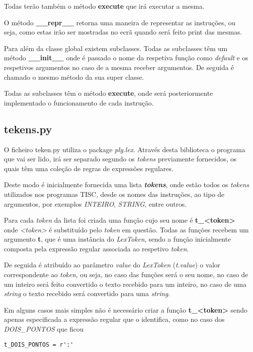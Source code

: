 \documentclass[titlepage,11pt,svgnames]{article}   %
\begin{document}
\begin{itemize}
Todas terão também o método \textbf{execute} que irá executar a mesma.

O método \textbf{\_\_repr\_\_} retorna uma maneira de representar as instruções, ou seja, como estas irão ser mostradas no ecrã quando será feito print das mesmas.

Para além da classe global existem subclasses. Todas as subclasses têm um método \textbf{\_\_init\_\_} onde é passado o nome da respetiva função como \textit{default} e os respetivos argumentos no caso de a mesma receber argumentos. De seguida é chamado o mesmo método da sua super classe.

Todas as subclasses têm o método \textbf{execute}, onde será posteriormente implementado o funcionamento de cada instrução.

\end{itemize}

\subsection{tekens.py}

O ficheiro teken.py utiliza o package \textit{ply.lex}. Através desta biblioteca o programa que vai ser lido, irá ser separado segundo os \textit{tokens} previamente fornecidos, os quais têm uma coleção de regras de expressões regulares.

Deste modo é inicialmente fornecida uma lista \textbf{\textit{tokens}}, onde estão todos os \textit{tokens} utilizados nos programas TISC, desde os nomes das instruções, ao tipo de argumentos, por exemplos \textit{INTEIRO}, \textit{STRING}, entre outros.

Para cada \textit{token} da lista foi criada uma função cujo seu nome é \textbf{t\_<token>} onde \textit{<token>} é substituído pelo \textit{token} em questão. Todas as funções recebem um argumento \textbf{t}, que é uma instância do \textit{LexToken}, sendo a função inicialmente composta pela expressão regular associada ao respetivo \textit{token}. 

De seguida é atribuído ao parâmetro \textit{value} do \textit{LexToken} (\textit{t.value}) o valor correspondente ao \textit{token}, ou seja, no caso das funções será o seu nome, no caso de um inteiro será feito convertido o texto recebido para um inteiro, no caso de uma \textit{string} o texto recebido será convertido para uma \textit{string}.

Em alguns casos mais simples não é necessário criar a função \textbf{t\_<token>} sendo apenas especificada a expressão regular que o identifica, como no caso dos \textit{DOIS\_PONTOS} que ficou 
\begin{lstlisting}
t_DOIS_PONTOS = r':'
\end{lstlisting}
\end{document}
